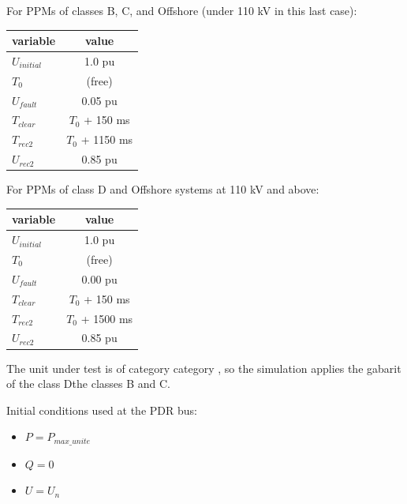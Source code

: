     For PPMs of classes B, C, and Offshore (under 110 kV in this last case):
    \begin{center}
        \begin{tabular}{lc}
            \toprule
            \textbf{variable} & \textbf{value} \\
            \midrule
            $U_{initial}$     & 1.0 pu                   \\
            $T_{0}$           & (free)                   \\
            $U_{fault}$       & 0.05 pu                  \\
            $T_{clear}$       & $T_{0}$ + 150 ms         \\
            $T_{rec2}$        & $T_{0}$ + 1150 ms        \\
            $U_{rec2}$        & 0.85 pu                  \\
            \bottomrule
        \end{tabular}
    \end{center}

    For PPMs of class D and Offshore systems at 110 kV and above:
    \begin{center}
        \begin{tabular}{lc}
            \toprule
            \textbf{variable} & \textbf{value} \\
            \midrule
            $U_{initial}$     & 1.0 pu                   \\
            $T_{0}$           & (free)                   \\
            $U_{fault}$       & 0.00 pu                  \\
            $T_{clear}$       & $T_{0}$ + 150 ms         \\
            $T_{rec2 }$       & $T_{0}$ + 1500 ms        \\
            $U_{rec2}$        & 0.85 pu                  \\
            \bottomrule
        \end{tabular}
    \end{center}

    \noindent The unit under test is of category {{ category }}, so the simulation
    applies the gabarit of the class Dthe classes B and C.

    \begin{description}
        \item Initial conditions used at the PDR bus:
        \begin{itemize}
            \item $P = P_{max\_unite}$
            \item $Q = 0$
            \item $U = U_{n}$
        \end{itemize}
    \end{description}

